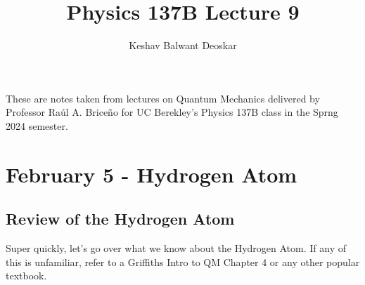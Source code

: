 \documentclass{article}
\title{Physics 137B Lecture 9}
\author{Keshav Balwant Deoskar}
\begin{document}
\maketitle

These are notes taken from lectures on Quantum Mechanics delivered by Professor Raúl A. Briceño for UC Berekley's Physics 137B class in the Sprng 2024 semester.

\tableofcontents

\pagebreak

\section{February 5 - Hydrogen Atom}

\vskip 1cm
\subsection{Review of the Hydrogen Atom}


\vskip 0.5cm
Super quickly, let's go over what we know about the Hydrogen Atom. If any of this is unfamiliar, refer to a Griffiths Intro to QM Chapter 4 or any other popular textbook.
\end{document}

